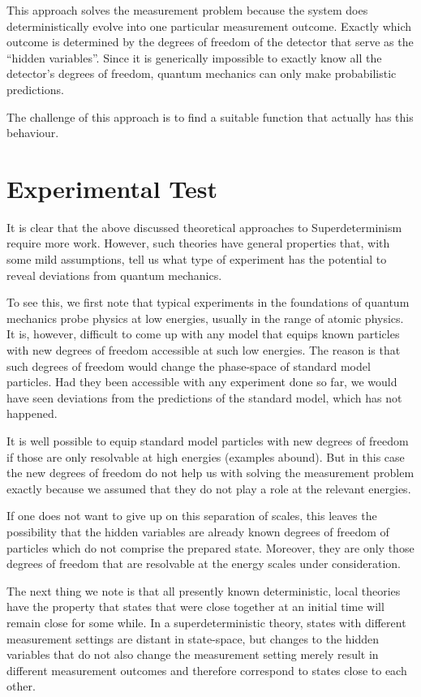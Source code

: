\documentclass[12pt]{article}
\begin{document}
This approach solves the measurement problem because the system does deterministically evolve into one particular measurement outcome. Exactly which outcome is determined by the degrees of freedom of the detector that serve as the ``hidden variables''. Since it is generically impossible to exactly know all the detector's degrees of freedom, quantum mechanics can only make probabilistic predictions.

The challenge of this approach is to find a suitable function that actually has this behaviour. 

\section{Experimental Test}

It is clear that the above discussed theoretical approaches to Superdeterminism require more work. However, such theories have general properties that, with some
mild assumptions, tell us what type of experiment has the potential to reveal deviations from quantum mechanics. 

To see this, we first note that typical experiments in the foundations of quantum mechanics probe physics at low energies, usually in the range of atomic physics. It is, however, difficult to come up with any model that equips known particles with new degrees of freedom accessible at such low energies. The reason is that such degrees of freedom would change the phase-space of standard model particles. Had they been accessible with any experiment done so far, we would have seen deviations from the predictions of the standard model, which has not happened. 

It is well possible to equip standard model particles with new degrees of freedom if those are only resolvable at high energies (examples abound). But in this case
the new degrees of freedom do not help us with solving the measurement problem exactly because we assumed that they do not play a role at the relevant energies. 

If one does not want to give up on this separation of scales, this leaves the possibility that the hidden variables are already known degrees of freedom of particles which do not comprise the prepared state. Moreover, they are only those degrees of freedom that are resolvable at the energy scales under consideration. 

The next thing we note is that all presently known deterministic, local theories have the property that states that were close together at an initial time will remain close for some while. In a superdeterministic theory, states with different measurement settings are distant in state-space, but changes to the hidden variables that do not also change the measurement setting merely result in different measurement outcomes and therefore correspond to states close to each other. 
\end{document}
